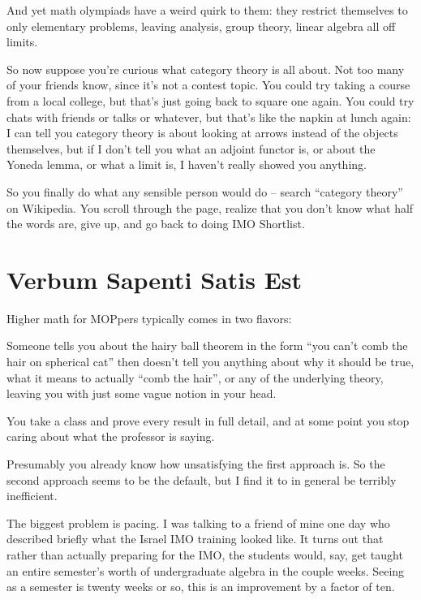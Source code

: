And yet math olympiads have a weird quirk to them: they restrict themselves to only elementary problems, leaving analysis, group theory, linear algebra all off limits.

So now suppose you're curious what category theory is all about.
Not too many of your friends know, since it's not a contest topic.
You could try taking a course from a local college, but that's just going back to square one again.
You could try chats with friends or talks or whatever, but that's like the napkin at lunch again: I can tell you category theory is about looking at arrows instead of the objects themselves, but if I don't tell you what an adjoint functor is, or about the Yoneda lemma, or what a limit is, I haven't really showed you anything.

So you finally do what any sensible person would do -- search ``category theory'' on Wikipedia.
You scroll through the page, realize that you don't know what half the words are, give up, and go back to doing IMO Shortlist.




\section*{Verbum Sapenti Satis Est}
Higher math for MOPpers typically comes in two flavors:
\begin{itemize}
	\ii Someone tells you about the hairy ball theorem in the form ``you can't comb the hair on spherical cat''
	then doesn't tell you anything about why it should be true, what it means to actually ``comb the hair'', 
	or any of the underlying theory, leaving you with just some vague notion in your head.

	\ii You take a class and prove every result in full detail, and at some point
	you stop caring about what the professor is saying.
\end{itemize}
Presumably you already know how unsatisfying the first approach is.
So the second approach seems to be the default, but I find it to in general be terribly inefficient.

The biggest problem is pacing.
I was talking to a friend of mine one day who described briefly
what the Israel IMO training looked like.
It turns out that rather than actually preparing for the IMO,
the students would, say, get taught an entire semester's worth of
undergraduate algebra in the couple weeks.
Seeing as a semester is twenty weeks or so, this is an improvement
by a factor of ten.

